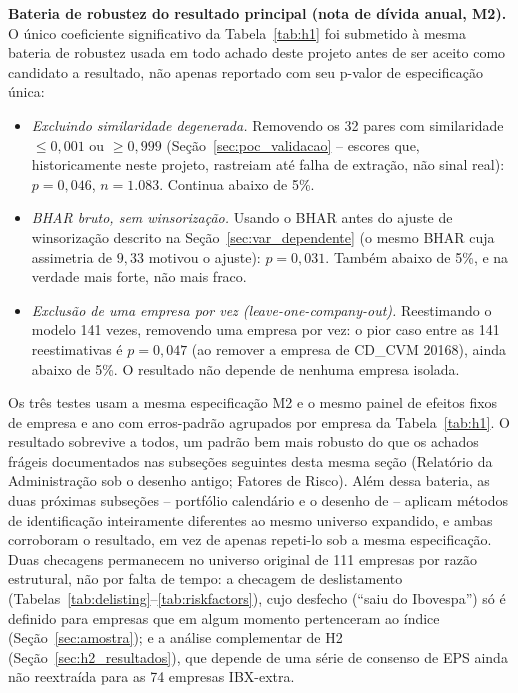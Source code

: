 \documentclass[a4paper,12pt]{report}
\begin{document}
\textbf{Bateria de robustez do resultado principal (nota de dívida anual, M2).} O único coeficiente significativo da Tabela~\ref{tab:h1} foi submetido à mesma bateria de robustez usada em todo achado deste projeto antes de ser aceito como candidato a resultado, não apenas reportado com seu p-valor de especificação única:
\begin{itemize}
    \item \textit{Excluindo similaridade degenerada.} Removendo os 32 pares com similaridade $\leq 0{,}001$ ou $\geq 0{,}999$ (Seção~\ref{sec:poc_validacao} -- escores que, historicamente neste projeto, rastreiam até falha de extração, não sinal real): $p=0{,}046$, $n=1{.}083$. Continua abaixo de 5\%.
    \item \textit{BHAR bruto, sem winsorização.} Usando o BHAR antes do ajuste de winsorização descrito na Seção~\ref{sec:var_dependente} (o mesmo BHAR cuja assimetria de $9{,}33$ motivou o ajuste): $p=0{,}031$. Também abaixo de 5\%, e na verdade mais forte, não mais fraco.
    \item \textit{Exclusão de uma empresa por vez (\textit{leave-one-company-out}).} Reestimando o modelo 141 vezes, removendo uma empresa por vez: o pior caso entre as 141 reestimativas é $p=0{,}047$ (ao remover a empresa de CD\_CVM 20168), ainda abaixo de 5\%. O resultado não depende de nenhuma empresa isolada.
\end{itemize}
Os três testes usam a mesma especificação M2 e o mesmo painel de efeitos fixos de empresa e ano com erros-padrão agrupados por empresa da Tabela~\ref{tab:h1}. O resultado sobrevive a todos, um padrão bem mais robusto do que os achados frágeis documentados nas subseções seguintes desta mesma seção (Relatório da Administração sob o desenho antigo; Fatores de Risco). Além dessa bateria, as duas próximas subseções -- portfólio calendário e o desenho de  -- aplicam métodos de identificação inteiramente diferentes ao mesmo universo expandido, e ambas corroboram o resultado, em vez de apenas repeti-lo sob a mesma especificação. Duas checagens permanecem no universo original de 111 empresas por razão estrutural, não por falta de tempo: a checagem de deslistamento (Tabelas~\ref{tab:delisting}--\ref{tab:riskfactors}), cujo desfecho (``saiu do Ibovespa'') só é definido para empresas que em algum momento pertenceram ao índice (Seção~\ref{sec:amostra}); e a análise complementar de H2 (Seção~\ref{sec:h2_resultados}), que depende de uma série de consenso de EPS ainda não reextraída para as 74 empresas IBX-extra.
\end{document}
